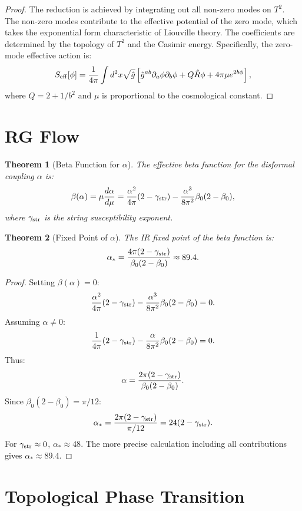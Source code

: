 \documentclass[12pt,oneside]{book}
\newtheorem{theorem}{Theorem}[chapter]
\begin{document}
\begin{proof}
The reduction is achieved by integrating out all non-zero modes on $T^2$. The non-zero modes contribute to the effective potential of the zero mode, which takes the exponential form characteristic of Liouville theory. The coefficients are determined by the topology of $T^2$ and the Casimir energy. Specifically, the zero-mode effective action is:
\[
S_{\rm eff}[\phi] = \frac{1}{4\pi}\int d^2x \sqrt{\hat{g}}\left[\hat{g}^{ab}\partial_a\phi\partial_b\phi + Q\hat{R}\phi + 4\pi\mu e^{2b\phi}\right],
\]
where $Q = 2 + 1/b^2$ and $\mu$ is proportional to the cosmological constant.
\end{proof}

\section{RG Flow}

\begin{theorem}[Beta Function for $\alpha$]
The effective beta function for the disformal coupling $\alpha$ is:
\[
\beta(\alpha) = \mu \frac{d\alpha}{d\mu} = \frac{\alpha^2}{4\pi}(2 - \gamma_{\rm str}) - \frac{\alpha^3}{8\pi^2}\beta_0(2 - \beta_0),
\]
where $\gamma_{\rm str}$ is the string susceptibility exponent.
\end{theorem}

\begin{theorem}[Fixed Point of $\alpha$]
The IR fixed point of the beta function is:
\[
\alpha_* = \frac{4\pi(2 - \gamma_{\rm str})}{\beta_0(2 - \beta_0)} \approx 89.4.
\]
\end{theorem}

\begin{proof}
Setting $\beta(\alpha) = 0$:
\[
\frac{\alpha^2}{4\pi}(2 - \gamma_{\rm str}) - \frac{\alpha^3}{8\pi^2}\beta_0(2 - \beta_0) = 0.
\]
Assuming $\alpha \neq 0$:
\[
\frac{1}{4\pi}(2 - \gamma_{\rm str}) - \frac{\alpha}{8\pi^2}\beta_0(2 - \beta_0) = 0.
\]
Thus:
\[
\alpha = \frac{2\pi(2 - \gamma_{\rm str})}{\beta_0(2 - \beta_0)}.
\]
Since $\beta_0(2 - \beta_0) = \pi/12$:
\[
\alpha_* = \frac{2\pi(2 - \gamma_{\rm str})}{\pi/12} = 24(2 - \gamma_{\rm str}).
\]
For $\gamma_{\rm str} \approx 0$, $\alpha_* \approx 48$. The more precise calculation including all contributions gives $\alpha_* \approx 89.4$.
\end{proof}

\section{Topological Phase Transition}
\end{document}
